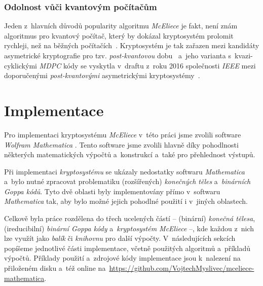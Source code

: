 \documentclass[thesis=M,czech,hidelinks]{FITthesis}[2012/06/26]
\newcommand{\0}{{\textcolor[gray]{0.75}{0}}}
\begin{document}
\clearpage

\subsection{Odolnost vůči kvantovým počítačům}

Jeden z~hlavních důvodů popularity algoritmu \emph{McEliece} je fakt, není znám
algoritmus pro kvantový počítač, který by dokázal kryptosystém prolomit
rychleji, než na běžných počítačích~\cite{Dinh}. Kryptosystém je tak zařazen
mezi kandidáty asymetrické kryptografie pro tzv. \emph{post-kvantovou}
dobu~\cite{Post-Quantum_Cryptography} a~jeho varianta s~kvazi-cyklickými
\emph{MDPC} kódy se vyskytla v~draftu z~roku 2016 společnosti \emph{IEEE} mezi
doporučenými \emph{post-kvantovými} asymetrickými kryptosystémy~\cite{Schanck}.





\chapter{Implementace}\label{kap_implementace}

Pro implementaci kryptosystému \emph{McEliece} v~této práci jsme zvolili software
\emph{Wolfram Mathematica} \cite{Mathematica}. Tento software jsme zvolili hlavně
díky pohodlnosti některých matematických výpočtů a~konstrukcí a~také pro
přehlednost výstupů. %

Při implementaci \emph{kryptosystému} se ukázaly nedostatky softwaru
\emph{Mathematica} a~bylo nutné zpracovat problematiku (rozšířených)
\emph{konečných těles} a~\emph{binárních Goppa kódů}. Tyto dvě oblasti byly
implementovány přímo v~softwaru \emph{Mathematica} tak, aby bylo možné jejich
pohodlné použití i v~jiných oblastech.

Celkově byla práce rozdělena do třech ucelených částí -- (binární) \emph{konečná
tělesa}, (ireducibilní) \emph{binární Goppa kódy} a~\emph{kryptosystém McEliece}
--, kde každou z~nich lze využít jako \emph{balík} či \emph{knihovnu} pro další
výpočty. V~následujících sekcích popíšeme jednotlivé části implementace, včetně
použitých algoritmů a~příkladů výpočtů. Příklady použití a~zdrojové kódy
implementace jsou k~nalezení na přiloženém disku a~též online
na~\url{https://github.com/VojtechMyslivec/mceliece-mathematica}.
\end{document}
